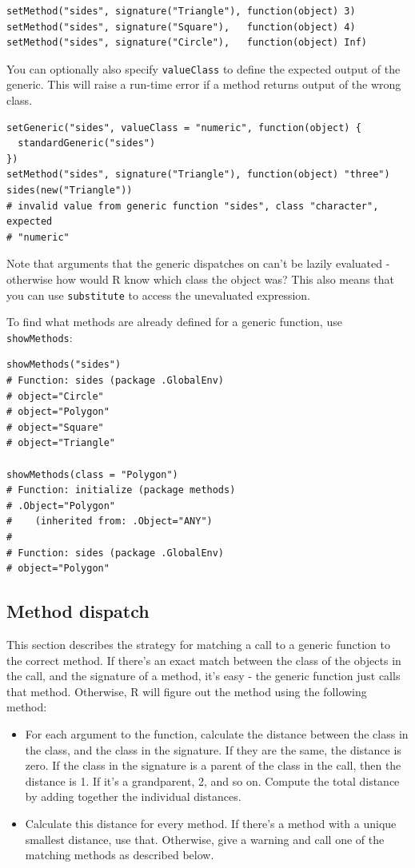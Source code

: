 \begin{verbatim}
setMethod("sides", signature("Triangle"), function(object) 3)
setMethod("sides", signature("Square"),   function(object) 4)
setMethod("sides", signature("Circle"),   function(object) Inf)
\end{verbatim}

You can optionally also specify \texttt{valueClass} to define the
expected output of the generic. This will raise a run-time error if a
method returns output of the wrong class.

\begin{verbatim}
setGeneric("sides", valueClass = "numeric", function(object) {
  standardGeneric("sides")
})
setMethod("sides", signature("Triangle"), function(object) "three")
sides(new("Triangle"))
# invalid value from generic function "sides", class "character", expected
# "numeric"
\end{verbatim}

Note that arguments that the generic dispatches on can't be lazily
evaluated - otherwise how would R know which class the object was? This
also means that you can use \texttt{substitute} to access the
unevaluated expression.

To find what methods are already defined for a generic function, use
\texttt{showMethods}:

\begin{verbatim}
showMethods("sides")
# Function: sides (package .GlobalEnv)
# object="Circle"
# object="Polygon"
# object="Square"
# object="Triangle"

showMethods(class = "Polygon")
# Function: initialize (package methods)
# .Object="Polygon"
#    (inherited from: .Object="ANY")
# 
# Function: sides (package .GlobalEnv)
# object="Polygon"
\end{verbatim}

\subsection{Method dispatch}

This section describes the strategy for matching a call to a generic
function to the correct method. If there's an exact match between the
class of the objects in the call, and the signature of a method, it's
easy - the generic function just calls that method. Otherwise, R will
figure out the method using the following method:

\begin{itemize}
\item
  For each argument to the function, calculate the distance between the
  class in the class, and the class in the signature. If they are the
  same, the distance is zero. If the class in the signature is a parent
  of the class in the call, then the distance is 1. If it's a
  grandparent, 2, and so on. Compute the total distance by adding
  together the individual distances.
\item
  Calculate this distance for every method. If there's a method with a
  unique smallest distance, use that. Otherwise, give a warning and call
  one of the matching methods as described below.
\end{itemize}

